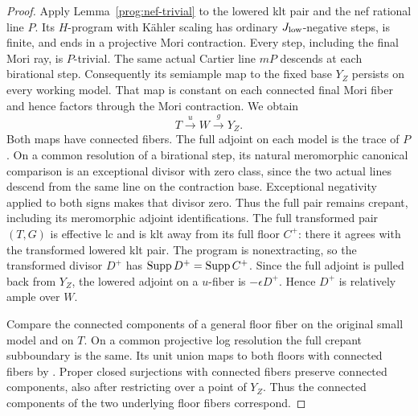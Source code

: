 \begin{proof}
Apply Lemma~\ref{prog:nef-trivial} to the lowered klt pair and the nef
rational line \(P\).  Its \(H\)-program with K\"ahler scaling has ordinary
\(J_{\rm low}\)-negative steps, is finite, and ends in a projective Mori
contraction.  Every step, including the final Mori ray, is \(P\)-trivial.
The same actual Cartier line \(mP\) descends at each birational step.
Consequently its semiample map to the fixed base \(Y_Z\) persists on
every working model.  That map is constant on each connected final Mori
fiber and hence factors through the Mori contraction.  We obtain
\[
 T\xrightarrow{u}W\xrightarrow{g}Y_Z.
\]
Both maps have connected fibers.  The full adjoint on each model is the
trace of \(P\).  On a common resolution of a birational step, its natural
meromorphic canonical comparison is an exceptional divisor with zero
class, since the two actual lines descend from the same line on the
contraction base.  Exceptional negativity applied to both signs makes
that divisor zero.  Thus the full pair remains crepant, including its
meromorphic adjoint identifications.  The full transformed pair
\((T,G)\) is effective lc and is klt away from its full floor \(C^+\):
there it agrees with the transformed lowered klt pair.  The program is
nonextracting, so the transformed divisor \(D^+\) has
\(\operatorname{Supp} D^+=\operatorname{Supp} C^+\).  Since the full adjoint is pulled back from
\(Y_Z\), the lowered adjoint on a \(u\)-fiber is
\(-\epsilon D^+\).  Hence \(D^+\) is relatively ample over \(W\).

Compare the connected components of a general floor fiber on the original
small model and on \(T\).  On a common projective log resolution the
full crepant subboundary is the same.  Its unit union maps to both floors
with connected fibers by \cite[Lemma~2.1]{BL}.  Proper closed surjections
with connected fibers preserve connected components, also after restricting
over a point of \(Y_Z\).  Thus the connected components of the two
underlying floor fibers correspond.


\end{proof}
